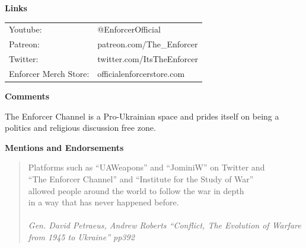 \documentclass[11pt]{book}
\begin{document}
\textbf{Links}

\begin{tabular}{l l}
  Youtube: & @EnforcerOfficial \\
  Patreon: & patreon.com/The\_Enforcer \\
  Twitter: & twitter.com/ItsTheEnforcer \\
  Enforcer Merch Store: & officialenforcerstore.com 
\end{tabular}

\textbf{Comments}

The Enforcer Channel is a Pro-Ukrainian space and prides itself on being 
a politics and religious discussion free zone.

\textbf{Mentions and Endorsements}
\begin{quote}
Platforms such as ``UAWeapons'' and ``JominiW'' on Twitter and\\
``The Enforcer Channel'' and ``Institute for the Study of War'' \\
allowed people around the world to follow the war in depth \\
in a way that has never happened before. \\
\\
\textit{Gen. David Petraeus, Andrew Roberts ``Conflict, The Evolution of Warfare from
  1945 to Ukraine'' pp392}
\end{quote}

\newpage \ \newpage

\end{document}
